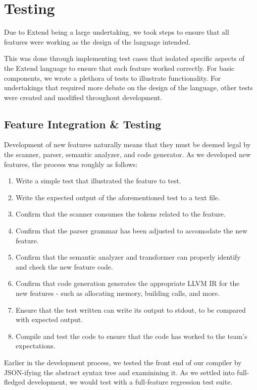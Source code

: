\chapter{Testing}
Due to Extend being a large undertaking, we took steps to ensure that all features were working as the design of the language intended.

\medskip \noindent
This was done through implementing test cases that isolated specific aspects of the Extend language to ensure that each feature worked correctly. For basic components, we wrote a plethora of tests to illustrate functionality. For undertakings that required more debate on the design of the language, other tests were created and modified throughout development.

\section{Feature Integration \& Testing}
Development of new features naturally means that they must be deemed legal by the scanner, parser, semantic analyzer, and code generator. As we developed new features, the process was roughly as follows:
  \begin{enumerate}
    \item Write a simple test that illustrated the feature to test.
    \item Write the expected output of the aforementioned test to a text file.
    \item Confirm that the scanner consumes the tokens related to the feature.
    \item Confirm that the parser grammar has been adjusted to accomodate the new feature.
    \item Confirm that the semantic analyzer and transformer can properly identify and check the new feature code.
    \item Confirm that code generation generates the appropriate LLVM IR for the new features - such as allocating memory, building calls, and more.
    \item Ensure that the test written can write its output to stdout, to be compared with expected output.
    \item Compile and test the code to ensure that the code has worked to the team's expectations.
  \end{enumerate}

  \medskip \noindent
  Earlier in the development process, we tested the front end of our compiler by JSON-ifying the abstract syntax tree and examinining it. As we settled into full-fledged development, we would test with a full-feature regression test suite.

